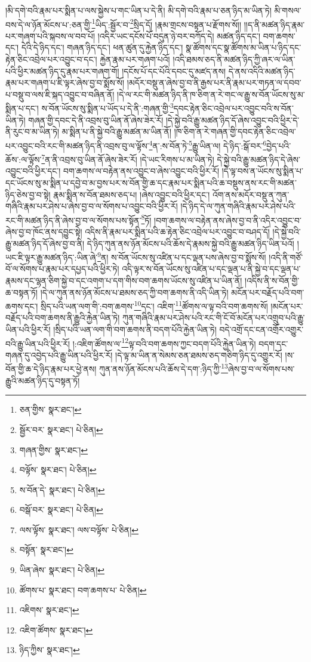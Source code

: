 །མི་དགེ་བའི་རྣམ་པར་སྨིན་པ་ལས་སྐྱེས་པ་གང་ཡིན་པ་དེ་ནི། མི་དགེ་བའི་རྣམ་པ་ཅན་ཉིད་མ་ཡིན་ཏེ། མི་གསལ་བས་དེ་ལ་ཉོན་མོངས་པ་:ཅན་གྱི་\footnote{ཅན་གྱིས་  སྣར་ཐང་། }ཡིད་:སྦྱོར་བ་\footnote{སྦྱོར་བར་  སྣར་ཐང་།  པེ་ཅིན། }སྲིད་དོ། །རྣམ་གྲངས་བསྟན་པ་རྫོགས་སོ།། །།ད་ནི་མཚན་ཉིད་རྣམ་པར་གཞག་པའི་སྐབས་ལ་བབ་པོ། །འདིར་ཡང་དངོས་པོ་བདུན་ཉེ་བར་བཀོད་དེ། མཚན་ཉིད་དང་། བག་ཆགས་དང་། དེའི་དེ་ཉིད་དང་། གཞན་ཉིད་དང་། ཕན་ཚུན་དུ་རྐྱེན་ཉིད་དང་། སྣ་ཚོགས་དང་སྣ་ཚོགས་མ་ཡིན་པ་ཉིད་དང་རྟེན་ཅིང་འབྲེལ་པར་འབྱུང་བ་དང་། རྐྱེན་རྣམ་པར་གཞག་པའོ། །འདི་ཐམས་ཅད་ནི་མཚན་ཉིད་ཀྱི་ཞར་ལ་ཡིན་པའི་ཕྱིར་མཚན་ཉིད་དུ་རྣམ་པར་གཞག་གོ། །དངོས་པོ་དང་པོའི་དབང་དུ་མཛད་ནས། དེ་ནས་འདིའི་མཚན་ཉིད་རྣམ་པར་གཞག་པ་ཇི་ལྟར་ཞེས་བྱ་བ་སྨོས་སོ། །མདོར་བསྡུ་ན་ཞེས་བྱ་བ་ནི་རྒྱས་པར་ནི་རྣམ་པར་གཏན་ལ་དབབ་པ་བསྡུ་བ་ལས་ཇི་སྐད་འབྱུང་བ་བཞིན་ནོ། །དེ་ལ་རང་གི་མཚན་ཉིད་ནི་ཁ་ཅིག་ན་རེ་གང་ལ་རྒྱུ་ས་བོན་ཡོངས་སུ་མ་སྨིན་པ་དང་། ས་བོན་ཡོངས་སུ་སྨིན་པ་ཡོད་པ་དེ་ནི་:གཞན་གྱི་\footnote{གཞན་གྱིས་  སྣར་ཐང་། }དབང་རྟེན་ཅིང་འབྲེལ་པར་འབྱུང་བའི་ས་བོན་ཡིན་ཏེ། གཞན་གྱི་དབང་དེ་ནི་འབྲས་བུ་ཡིན་ནོ་ཞེས་ཟེར་རོ། །དེ་སྐྱེ་བའི་རྒྱུ་མཚན་ཉིད་དོ་ཞེས་འབྱུང་བའི་ཕྱིར་དེ་ནི་རུང་བ་མ་ཡིན་ཏེ། མ་སྨིན་པ་ནི་སྐྱེ་བའི་རྒྱུ་མཚན་མ་ཡིན་ནོ། །ཁ་ཅིག་ན་རེ་གཞན་གྱི་དབང་རྟེན་ཅིང་འབྲེལ་པར་འབྱུང་བའི་རང་གི་མཚན་ཉིད་ནི་འབྲས་བུ་ལ་ལྟོས་\footnote{བལྟོས་  སྣར་ཐང་།  པེ་ཅིན། }ན་:ས་བོན་ཏེ་\footnote{ས་བོན་དེ་  སྣར་ཐང་།  པེ་ཅིན། }རྒྱུ་ཡིན་ལ། དེ་ཉིད་:སྒོ་བར་\footnote{བསྒོ་བར་  སྣར་ཐང་།  པེ་ཅིན། }བྱེད་པའི་ཆོས་:ལ་ལྟོས་\footnote{ལས་ལྟོས་  སྣར་ཐང་། ལས་བལྟོས་  པེ་ཅིན། }ན་ནི་འབྲས་བུ་ཡིན་ནོ་ཞེས་ཟེར་རོ། །དེ་ཡང་རིགས་པ་མ་ཡིན་ཏེ། དེ་སྐྱེ་བའི་རྒྱུ་མཚན་ཉིད་དེ་ཞེས་འབྱུང་བའི་ཕྱིར་དང་། བག་ཆགས་ལ་བརྟེན་ནས་འབྱུང་བ་ཞེས་འབྱུང་བའི་ཕྱིར་རོ། །དེ་ལྟ་བས་ན་ཡོངས་སུ་སྨིན་པ་དང་ཡོངས་སུ་མ་སྨིན་པ་དབྱེ་བ་མ་བྱས་པར་ས་བོན་གྱི་ཆ་དང་རྣམ་པར་སྨིན་པའི་ཆ་བསྡུས་ནས་རང་གི་མཚན་ཉིད་ཅེས་བྱ་བ་སྟེ། རྣམ་སྨིན་ས་བོན་ཐམས་ཅད་པ། །ཞེས་འབྱུང་བའི་ཕྱིར་དང་། འོག་ནས་མདོར་བསྡུ་ན་ཀུན་གཞིའི་རྣམ་པར་ཤེས་པ་ཞེས་བྱ་བ་ལ་སོགས་པ་འབྱུང་བའི་ཕྱིར་རོ། །དེ་ཉིད་དེ་ལ་ཀུན་གཞིའི་རྣམ་པར་ཤེས་པའི་རང་གི་མཚན་ཉིད་ནི་ཞེས་བྱ་བ་ལ་སོགས་པས་སྟོན་\footnote{བསྟོན་  སྣར་ཐང་། }ཏོ། །བག་ཆགས་ལ་བརྟེན་ནས་ཞེས་བྱ་བ་ནི་འདིར་འབྱུང་བ་ཞེས་བྱ་བ་ཁོང་ནས་དབྱུང་སྟེ། འདིས་ནི་རྣམ་པར་སྨིན་པའི་ཆ་རྟེན་ཅིང་འབྲེལ་པར་འབྱུང་བ་བཤད་དོ། །དེ་སྐྱེ་བའི་རྒྱུ་མཚན་ཉིད་དོ་ཞེས་བྱ་བ་ནི། དེ་ཉིད་ཀུན་ནས་ཉོན་མོངས་པའི་ཆོས་དེ་རྣམས་སྐྱེ་བའི་རྒྱུ་མཚན་ཉིད་ཡིན་པའོ། །ཡང་ཇི་ལྟར་རྒྱུ་མཚན་ཉིད་:ཡིན་ཞེ་\footnote{ཡིན་ཞེས་  སྣར་ཐང་།  པེ་ཅིན། }ན། ས་བོན་ཡོངས་སུ་འཛིན་པ་དང་ལྡན་པས་ཞེས་བྱ་བ་སྨོས་སོ། །འདི་ནི་གཙོ་བོ་ལ་སོགས་པ་རྣམ་པར་དཔྱད་པའི་ཕྱིར་ཏེ། འདི་ལྟར་ས་བོན་ཡོངས་སུ་འཛིན་པ་དང་ལྡན་པ་ནི་སྐྱེ་བ་དང་ལྡན་པ་རྣམས་དང་ལྷན་ཅིག་སྐྱེ་བ་དང་འགག་པ་དག་གིས་བག་ཆགས་ཡོངས་སུ་འཛིན་པ་ཡིན་ནོ། །འདིས་ནི་ས་བོན་གྱི་ཆ་བསྟན་ཏོ། །དེ་ལ་ཀུན་ནས་ཉོན་མོངས་པ་ཐམས་ཅད་ཀྱི་བག་ཆགས་ནི་འདི་ཡིན་ཏེ། མངོན་པར་བརྗོད་པའི་བག་ཆགས་དང་། སྲིད་པའི་ཡན་ལག་གི་:བག་ཆགས་\footnote{ཚོགས་པ་  སྣར་ཐང་། བག་ཆགས་པ་  པེ་ཅིན། }དང་། འཇིག་\footnote{འཇིགས་  སྣར་ཐང་། }ཚོགས་ལ་ལྟ་བའི་བག་ཆགས་སོ། །མངོན་པར་བརྗོད་པའི་བག་ཆགས་ནི་རྒྱུའི་རྐྱེན་ཡིན་ཏེ། ཀུན་གཞིའི་རྣམ་པར་ཤེས་པའི་རང་གི་ངོ་བོ་མངོན་པར་འགྲུབ་པའི་རྒྱུ་ཡིན་པའི་ཕྱིར་རོ། །སྲིད་པའི་ཡན་ལག་གི་བག་ཆགས་ནི་བདག་པོའི་རྐྱེན་ཡིན་ཏེ། བདེ་འགྲོ་དང་ངན་འགྲོར་འགྱུར་བའི་རྒྱུ་ཡིན་པའི་ཕྱིར་རོ། །:འཇིག་ཚོགས་ལ་\footnote{འཇིག་ཚོགས་  སྣར་ཐང་། }ལྟ་བའི་བག་ཆགས་ཀྱང་བདག་པོའི་རྐྱེན་ཡིན་ཏེ། བདག་དང་གཞན་དུ་འབྱེད་པའི་རྒྱུ་ཡིན་པའི་ཕྱིར་རོ། །དེ་ལྟ་མ་ཡིན་ན་སེམས་ཅན་ཐམས་ཅད་གཅིག་ཉིད་དུ་འགྱུར་རོ། །ས་བོན་གྱི་ཆ་དེ་ཉིད་རྣམ་པར་ཕྱེ་ནས། ཀུན་ནས་ཉོན་མོངས་པའི་ཆོས་དེ་དག་:ཉིད་ཀྱི་\footnote{ཉིད་ཀྱིས་  སྣར་ཐང་། }ཞེས་བྱ་བ་ལ་སོགས་པས་རྒྱུའི་མཚན་ཉིད་དུ་བསྟན་ཏོ། 